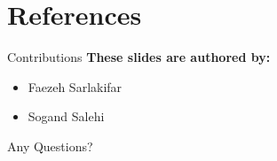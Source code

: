\documentclass[serif, aspectratio=169]{beamer}
\begin{document}
\section{References}

\begin{frame}[allowframebreaks]
    
    
    \nocite{*} %
\end{frame}

\begin{frame}{Contributions}
	\textbf{These slides are authored by:}
	\begin{itemize}
 		\item Faezeh Sarlakifar
		\item Sogand Salehi
	\end{itemize}
	    
\end{frame}
\begin{frame}
    \begin{center}
        {\Huge Any Questions?}
    \end{center}
\end{frame}
\end{document}
